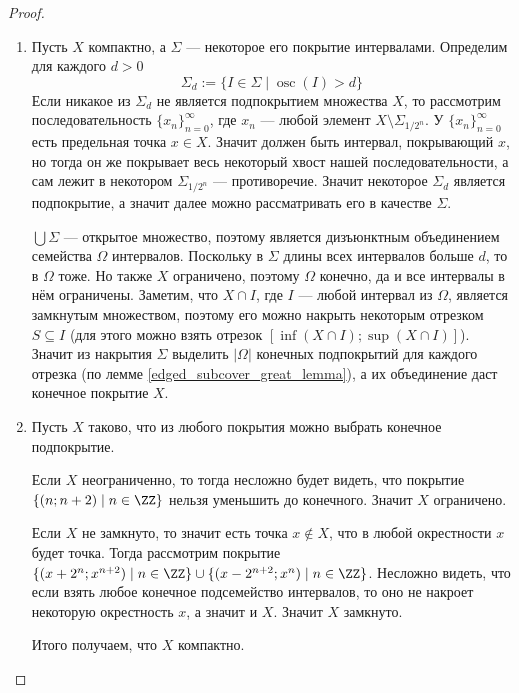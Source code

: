 \documentclass[12pt,a4paper]{article}
\DeclareMathOperator*{\osc}{osc}
\begin{document}
    \begin{proof}
        \begin{enumerate}
            \item Пусть $X$ компактно, а $\Sigma$ --- некоторое его покрытие интервалами. Определим для каждого $d > 0$
                \[\Sigma_d := \{I \in \Sigma\mid \osc(I) > d\}\]
                Если никакое из $\Sigma_d$ не является подпокрытием множества $X$, то рассмотрим последовательность $\{x_n\}_{n=0}^\infty$, где $x_n$ --- любой элемент $X \setminus \Sigma_{1/2^n}$. У $\{x_n\}_{n=0}^\infty$ есть предельная точка $x \in X$. Значит должен быть интервал, покрывающий $x$, но тогда он же покрывает весь некоторый хвост нашей последовательности, а сам лежит в некотором $\Sigma_{1/2^n}$ --- противоречие. Значит некоторое $\Sigma_d$ является подпокрытие, а значит далее можно рассматривать его в качестве $\Sigma$.

                $\bigcup \Sigma$ --- открытое множество, поэтому является дизъюнктным объединением семейства $\Omega$ интервалов. Поскольку в $\Sigma$ длины всех интервалов больше $d$, то в $\Omega$ тоже. Но также $X$ ограничено, поэтому $\Omega$ конечно, да и все интервалы в нём ограничены. Заметим, что $X \cap I$, где $I$ --- любой интервал из $\Omega$, является замкнутым множеством, поэтому его можно накрыть некоторым отрезком $S \subseteq I$ (для этого можно взять отрезок $[\inf(X \cap I); \sup(X \cap I)]$). Значит из накрытия $\Sigma$ выделить $|\Omega|$ конечных подпокрытий для каждого отрезка (по лемме \ref{edged_subcover_great_lemma}), а их объединение даст конечное покрытие $X$.

            \item Пусть $X$ таково, что из любого покрытия можно выбрать конечное подпокрытие.
            
                Если $X$ неограниченно, то тогда несложно будет видеть, что покрытие $\{(n; n+2) \mid n \in \ZZ\}$ нельзя уменьшить до конечного. Значит $X$ ограничено.

                Если $X$ не замкнуто, то значит есть точка $x \notin X$, что в любой окрестности $x$ будет точка. Тогда рассмотрим покрытие $\{(x + 2^n; x^{n+2}) \mid n \in \ZZ\} \cup \{(x - 2^{n+2}; x^n) \mid n \in \ZZ\}$. Несложно видеть, что если взять любое конечное подсемейство интервалов, то оно не накроет некоторую окрестность $x$, а значит и $X$. Значит $X$ замкнуто.

                Итого получаем, что $X$ компактно.
        \end{enumerate}
    \end{proof}
\end{document}
